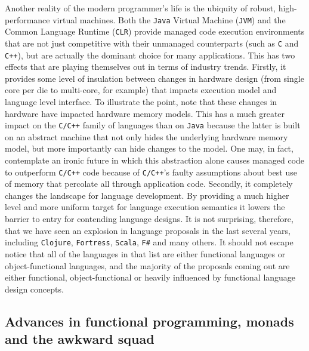 Another reality of the modern programmer's life is the ubiquity of
robust, high-performance virtual machines. Both the \texttt{Java}
Virtual Machine (\texttt{JVM}) and the Common Language Runtime
(\texttt{CLR}) provide managed code execution environments that are
not just competitive with their unmanaged counterparts (such as
\texttt{C} and \texttt{C++}), but are actually the dominant choice for
many applications. This has two effects that are playing themselves
out in terms of industry trends. Firstly, it provides some level of
insulation between changes in hardware design (from single core per
die to multi-core, for example) that impacts execution model and
language level interface. To illustrate the point, note that these
changes in hardware have impacted hardware memory models. This has a
much greater impact on the \texttt{C/C++} family of languages than on
\texttt{Java} because the latter is built on an abstract machine that
not only hides the underlying hardware memory model, but more
importantly can hide changes to the model. One may, in fact,
contemplate an ironic future in which this abstraction alone causes
managed code to outperform \texttt{C/C++} code because of
\texttt{C/C++}'s faulty assumptions about best use of memory that
percolate all through application code. Secondly, it completely
changes the landscape for language development. By providing a much
higher level and more uniform target for language execution semantics
it lowers the barrier to entry for contending language designs. It is
not surprising, therefore, that we have seen an explosion in language
proposals in the last several years, including \texttt{Clojure},
\texttt{Fortress}, \texttt{Scala}, \texttt{F\#} and many others. It
should not escape notice that all of the languages in that list are
either functional languages or object-functional languages, and the
majority of the proposals coming out are either functional,
object-functional or heavily influenced by functional language design
concepts.

\subsection{Advances in functional programming, monads and the awkward squad}

